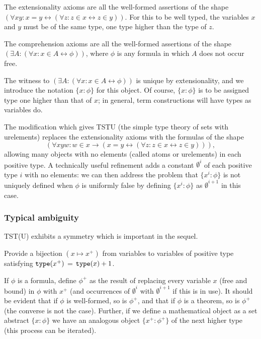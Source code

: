 \documentclass[112pt]{article}
\begin{document}
The extensionality axioms are all the well-formed assertions of the shape $(\forall xy:x=y \leftrightarrow (\forall z:z \in x \leftrightarrow z\in y))$.  For this to be well typed, the variables
$x$ and $y$ must be of the same type, one type higher than the type of $z$.

The comprehension axioms are all the well-formed assertions of the shape $(\exists A:(\forall x:x \in A \leftrightarrow \phi))$, where $\phi$ is any formula in which $A$ does not occur free.

The witness to $(\exists A:(\forall x:x \in A \leftrightarrow \phi))$ is unique by extensionality, and we introduce the notation $\{x:\phi\}$ for this object.  Of course, $\{x:\phi\}$  is to be assigned type one higher than that of $x$;  in general, term constructions will have types as variables do.

The modification which gives TSTU (the simple type theory of sets with urelements) replaces the extensionality axioms with the formulas of the shape $$(\forall xyw:w \in x \rightarrow (x=y \leftrightarrow (\forall z:z \in x \leftrightarrow z\in y))),$$  allowing many objects with no elements (called atoms or urelements)  in each positive type.  A technically useful refinement adds a constant $\emptyset^i$ of each positive type $i$ with no elements:  we can then address the problem that $\{x^i:\phi\}$ is not uniquely defined when $\phi$ is uniformly false by defining $\{x^i:\phi\}$ as $\emptyset^{i+1}$ in this case.

\subsubsection{Typical ambiguity}

TST(U) exhibits a symmetry which is important in the sequel.

Provide a bijection $(x \mapsto x^+)$ from variables to variables of positive type satisfying   ${\tt type}(x^+)$ = ${\tt type}(x)+1$.

If $\phi$ is a formula, define $\phi^+$ as the result of replacing every variable $x$ (free and bound) in $\phi$ with $x^+$ (and occurrences of $\emptyset^i$ with $\emptyset^{i+1}$ if this is in use).   It should be evident that if $\phi$ is well-formed, so is $\phi^+$,
and that if $\phi$ is a theorem, so is $\phi^+$ (the converse is not the case).  Further, if we define a mathematical object as a set abstract $\{x:\phi\}$ we have an analogous
object $\{x^+:\phi^+\}$ of the next higher type (this process can be iterated).
\end{document}
